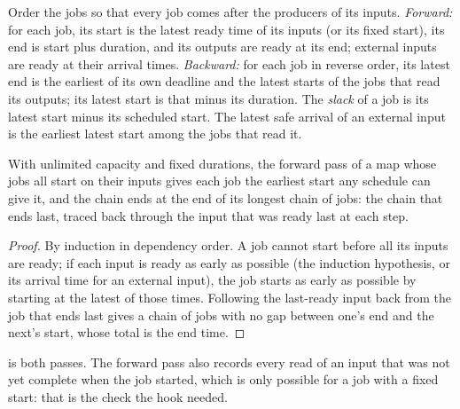 \begin{method}\label{met:pl:the-platform-map:passes}
Order the jobs so that every job comes after the producers of its inputs.
\emph{Forward:} for each job, its start is the latest ready time of its inputs (or its fixed start), its end is start plus
duration, and its outputs are ready at its end; external inputs are ready at their arrival times.
\emph{Backward:} for each job in reverse order, its latest end is the earliest of its own deadline and the latest starts of the
jobs that read its outputs; its latest start is that minus its duration. The \emph{slack} of a job is its latest start minus its
scheduled start. The latest safe arrival of an external input is the earliest latest start among the jobs that read it.
\end{method}

\begin{proposition}\label{prop:pl:the-platform-map:earliest}
With unlimited capacity and fixed durations, the forward pass of a map whose jobs all start on their inputs gives each job the
earliest start any schedule can give it, and the chain ends at the end of its longest chain of jobs: the chain that ends last,
traced back through the input that was ready last at each step.
\end{proposition}

\begin{proof}
By induction in dependency order. A job cannot start before all its inputs are ready; if each input is ready as early as
possible (the induction hypothesis, or its arrival time for an external input), the job starts as early as possible by
starting at the latest of those times. Following the last-ready input back from the job that ends last gives a chain of jobs
with no gap between one's end and the next's start, whose total is the end time.
\end{proof}

 is both passes. The forward pass also records every read of an input that was not yet
complete when the job started, which is only possible for a job with a fixed start: that is the check the hook needed.

\label{lst:pl:the-platform-map:passes}

